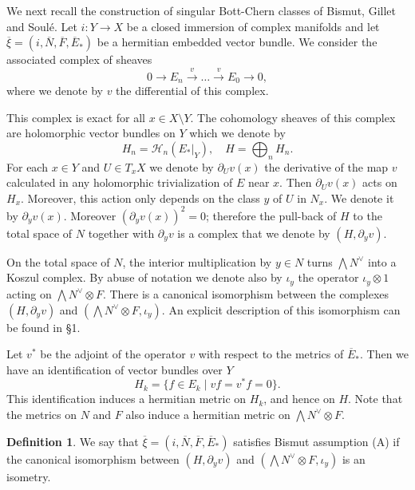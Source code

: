 \documentclass[10pt,twoside]{article}
\numberwithin{equation}{section}
\theoremstyle{plain}
\theoremstyle{definition}
\newtheorem{definition}[equation]{Definition}
\begin{document}
We next recall the construction of singular Bott-Chern classes of
Bismut, Gillet and Soul\'e. 
Let $i\colon Y\longrightarrow X$ be a closed immersion of complex manifolds and 
let $\overline{\xi}=(i,\overline N,\overline
F, \overline E_{\ast}) $ be a hermitian embedded vector bundle. We consider the
associated complex of sheaves
\begin{displaymath}
  0\to E_{n}\overset{v}{\to}\dots\overset{v}{\to}
  E_{0}\to 0, 
\end{displaymath}
where we denote by $v$ the differential of this complex.

This complex is exact for all $x\in X\setminus Y$. The cohomology
sheaves of this complex are holomorphic vector bundles on $Y$ which we
denote by
\begin{displaymath}
  H_{n}=\mathcal{H}_{n}(E_{\ast}|_{Y}),\quad
  H=\bigoplus _{n}H_{n}.
\end{displaymath}
For each $x\in Y$ and $U\in T_{x}X$ we denote by $\partial_{U}v(x)$
the derivative of the map $v$ calculated in any holomorphic
trivialization of $E$ near $x$. Then $\partial_{U}v(x)$ acts on
$H_{x}$. Moreover, this action only depends on the class $y$ of $U$
in $N_{x}$. We denote it by $\partial_{y}v(x)$. Moreover
$(\partial_{y}v(x))^{2}=0$; therefore the pull-back of $H$ to the
total space of $N$ together with $\partial_{y}v$ is a complex that
we denote by $(H,\partial_{y}v)$.

On the total space of $N$, the interior multiplication by $y\in N$
turns $\bigwedge N^{\vee}$ into a Koszul complex. By abuse of notation
we denote also by $\iota_{y}$ the operator $\iota_{y}\otimes 1$ acting
on $\bigwedge N^{\vee}\otimes F$. There is a canonical isomorphism
between the complexes $(H,\partial_{y}v)$
and $(\bigwedge N^{\vee}\otimes F,\iota_{y})$. An explicit description
of this isomorphism can be found in \cite{bismut90:SCCI} \S1.

Let $v^{\ast}$ be the adjoint of the operator $v$ with respect to the
metrics of $\overline E_{\ast}$. Then we have an identification of
vector bundles over $Y$
\begin{displaymath}
  H_{k}=\{f\in E_{k}\mid vf=v^{\ast}f=0\}.
\end{displaymath}
This identification induces a hermitian metric on $H_{k}$, and hence
on $H$. Note that the metrics on $N$ and $F$ also induce a hermitian
metric on $\bigwedge N^{\vee}\otimes F$.

\begin{definition}
We say that $\overline {\xi}=(i,\overline N,\overline
F, \overline {E}_{\ast})$ satisfies Bismut assumption (A) if the
canonical isomorphism between  $(H,\partial_{y}v)$ and 
$(\bigwedge N^{\vee}\otimes F,\iota_{y})$ is an isometry.
\end{definition}
\end{document}
